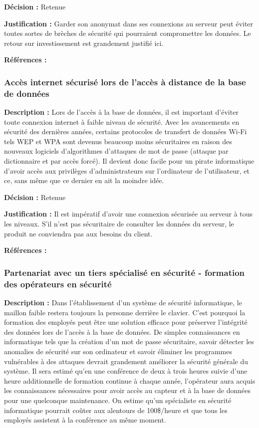 \textbf{Décision :} Retenue

\textbf{Justification :} Garder son anonymat dans ses connexions au serveur peut éviter toutes sortes de brèches de sécurité qui pourraient compromettre les données. Le retour sur investissement est grandement justifié ici.

\textbf{Références :} 

\subsubsection{Accès internet sécurisé lors de l’accès à distance de la base de données}

\textbf{Description :} Lors de l’accès à la base de données, il est important d’éviter toute connexion internet à faible niveau de sécurité. Avec les avancements en sécurité des dernières années, certains protocoles de transfert de données Wi-Fi tels WEP et WPA sont devenus beaucoup moins sécuritaires en raison des nouveaux logiciels d’algorithmes d’attaques de mot de passe (attaque par dictionnaire et par accès forcé). Il devient donc facile pour un pirate informatique d’avoir accès aux privilèges d’administrateurs sur l’ordinateur de l’utilisateur, et ce, sans même que ce dernier en ait la moindre idée.

\textbf{Décision :}  Retenue

\textbf{Justification :}  Il est impératif d’avoir une connexion sécurisée au serveur à tous les niveaux. S’il n’est pas sécuritaire de consulter les données du serveur, le produit ne conviendra pas aux besoins du client.

\textbf{Références :} 

\subsubsection{Partenariat avec un tiers spécialisé en sécurité - formation des opérateurs en sécurité}

\textbf{Description :} Dans l’établissement d’un système de sécurité informatique, le maillon faible restera toujours la personne derrière le clavier. C’est pourquoi la formation des employés peut être une solution efficace pour préserver l’intégrité des données lors de l’accès à la base de données. De simples connaissances en informatique tels que la création d’un mot de passe sécuritaire, savoir détecter les anomalies de sécurité sur son ordinateur et savoir éliminer les programmes vulnérables à des attaques devrait grandement améliorer la sécurité générale du système. Il sera estimé qu’en une conférence de deux à trois heures suivie d’une heure additionnelle de formation continue à chaque année, l’opérateur aura acquis les connaissances nécessaires pour avoir accès au capteur et à la base de données pour une quelconque maintenance. On estime qu’un spécialiste en sécurité informatique pourrait coûter aux alentours de 100\$/heure et que tous les employés assistent à la conférence au même moment. 

